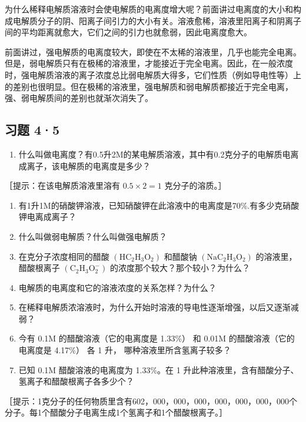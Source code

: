 为什么稀释电解质溶液时会使电解质的电离度增大呢？前面讲过电离度的大小和构成电解质分子的阴、阳离子间引力的大小有关。溶液愈稀，溶液里阳离子和阴离子间的平均距离就愈大，它们之间的引力也就愈弱，因此电离度愈大。

前面讲过，强电解质的电离度较大，即使在不太稀的溶液里，几乎也能完全电离。但是，弱电解质只有在极稀的溶液里，才能接近于完全电离。因此，在一般浓度时，强电解质溶液的离子浓度总比弱电解质大得多，它们性质（例如导电性等）上的差别也很明显。但在极稀的溶液里，强电解质和弱电解质都接近于完全电离，强、弱电解质间的差别也就渐次消失了。

\subsection{习题 4·5}

\begin{enumerate}
\item
  什么叫做电离度？有0.5升2M的某电解质溶液，其中有0.2克分子的电解质电离成离子，该电解质的电离度是多少？
\end{enumerate}

［提示：在该电解质溶液里溶有 \(0.5 \times 2 = 1\) 克分子的溶质。］

\begin{enumerate}[start=2]
\item
  有1升1M的硝酸钾溶液，已知硝酸钾在此溶液中的电离度是70\%.有多少克硝酸钾电离成离子？
\item
  什么叫做弱电解质？什么叫做强电解质？
\item
  在克分子浓度相同的醋酸
  \(\left(\mathrm{HC}_{2}\mathrm{H}_{3}\mathrm{O}_{2}\right)\) 和醋酸钠
  \(\left(\mathrm{NaC}_{2}\mathrm{H}_{3}\mathrm{O}_{2}\right)\)
  的溶液里，醋酸根离子
  \(\left(\mathrm{C}_{2}\mathrm{H}_{3}\mathrm{O}_{2}^{-}\right)\)
  的浓度那个较大？那个较小？为什么？
\item
  电解质的电离度和它的溶液浓度的关系怎样？为什么？
\item
  在稀释电解质浓溶液时，为什么开始时溶液的导电性逐渐增强，以后又逐渐减弱？
\item
  今有 0.1M 的醋酸溶液（它的电离度是 1.33\%） 和 0.01M
  的醋酸溶液（它的电离度是 4.17\%） 各 1 升， 哪种溶液里所含氢离子较多？
\item
  已知 0.1M 醋酸溶液的电离度为 1.33\%。在 1
  升此种溶液里，含有醋酸分子、氢离子和醋酸根离子各多少个？
\end{enumerate}

［提示：1克分子的任何物质里含有602，000，000，000，000，000，000，000个分子。每1个醋酸分子电离生成1个氢离子和1个醋酸根离子。］

